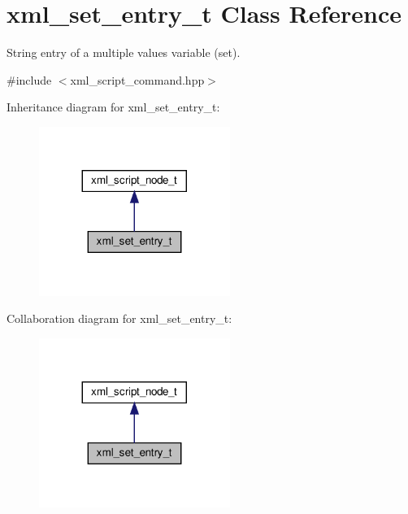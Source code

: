 \hypertarget{classxml__set__entry__t}{}\section{xml\+\_\+set\+\_\+entry\+\_\+t Class Reference}
\label{classxml__set__entry__t}


String entry of a multiple values variable (set).  




{\ttfamily \#include $<$xml\+\_\+script\+\_\+command.\+hpp$>$}



Inheritance diagram for xml\+\_\+set\+\_\+entry\+\_\+t\+:
\nopagebreak
\begin{figure}[H]
\begin{center}
\leavevmode
\includegraphics[width=176pt]{dc/d66/classxml__set__entry__t__inherit__graph}
\end{center}
\end{figure}


Collaboration diagram for xml\+\_\+set\+\_\+entry\+\_\+t\+:
\nopagebreak
\begin{figure}[H]
\begin{center}
\leavevmode
\includegraphics[width=176pt]{d4/daa/classxml__set__entry__t__coll__graph}
\end{center}
\end{figure}
